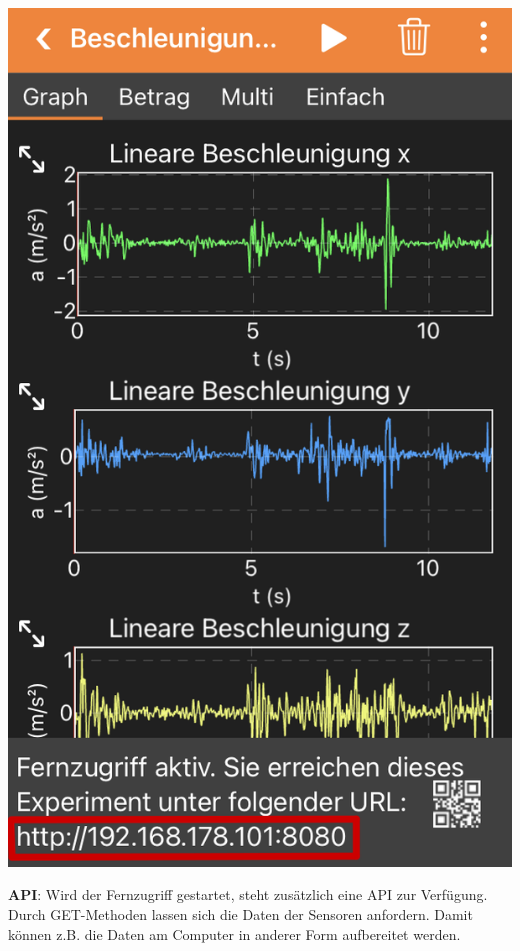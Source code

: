 \documentclass[../main.tex]{subfiles}
\begin{document}
\begin{tcolorbox}
\begin{minipage}[]{0.2\textwidth}
    \end{minipage}
    \begin{minipage}[]{0.2\textwidth}
        \includegraphics[width=\textwidth]{img/fernzugriff3}
    \end{minipage}
    
    \vspace{0.5cm}
    \textbf{API}: Wird der Fernzugriff gestartet, steht zusätzlich eine API zur Verfügung. Durch GET-Methoden lassen sich die Daten der Sensoren anfordern. Damit können z.B. die Daten am Computer in anderer Form aufbereitet werden.  
    

\end{tcolorbox}
\end{document}
